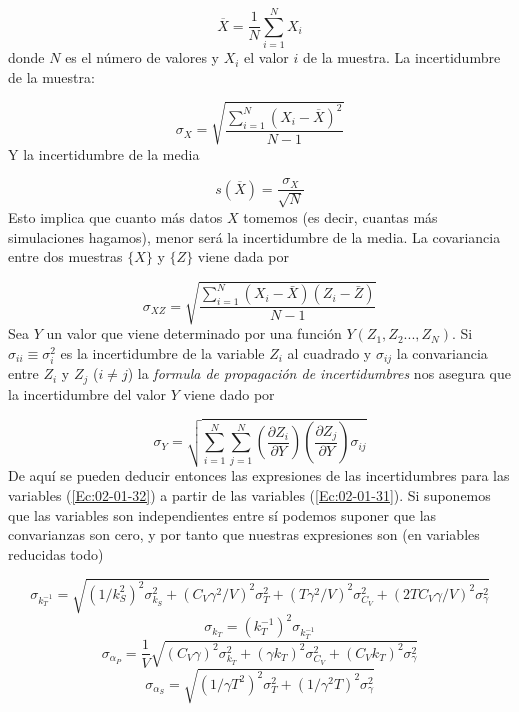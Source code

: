 \documentclass[11pt]{article} %
\newcommand{\parentesis}[1]{\left( #1  \right)}
\newcommand{\parciales}[2]{\frac{\partial #1}{\partial #2}}
\begin{document}
\begin{equation}
	 \overline{X} = \frac{1}{N}\sum_{i=1}^{N} X_i
\end{equation}
donde $N$ es el número de valores y $X_i$ el valor $i$ de la muestra. La incertidumbre de la muestra:

\begin{equation}
	\sigma_X = \sqrt{\frac{\sum_{i=1}^{N} \parentesis{X_i-\overline{X}}^2 }{N-1}}
\end{equation}
Y la incertidumbre de la media

\begin{equation}
	s(\overline{X}) = \frac{\sigma_X}{\sqrt{N}}
\end{equation}
Esto implica que cuanto más datos $X$ tomemos (es decir, cuantas más simulaciones hagamos), menor será la incertidumbre de la media. La covariancia entre dos muestras $\{ X \}$ y $\{ Z \}$ viene dada por 

\begin{equation}
	\sigma_{XZ} = \sqrt{ \frac{\sum_{i=1}^N (X_i-\bar{X})(Z_i-\bar{Z})}{N-1}}
\end{equation} 
Sea $Y$ un valor que viene determinado por una función $Y(Z_1,Z_2...,Z_N)$. Si $\sigma_{ii} \equiv \sigma_{i}^2$ es la incertidumbre de la variable $Z_i$ al cuadrado y $\sigma_{ij}$ la convariancia entre $Z_i$ y $Z_j$ ($i\neq j$) la \textit{formula de propagación de incertidumbres} nos asegura que la incertidumbre del valor $Y$ viene dado por

\begin{equation}
	\sigma_Y = \sqrt{\sum_{i=1}^N \sum_{j=1}^{N} \parentesis{\parciales{Z_i}{Y}}\parentesis{\parciales{Z_j}{Y}} \sigma_{ij} }
\end{equation} 
De aquí se pueden deducir entonces las expresiones de las incertidumbres para las variables (\ref{Ec:02-01-32}) a partir de las variables (\ref{Ec:02-01-31}). Si suponemos que las variables son independientes entre sí podemos suponer que las convarianzas son cero, y por tanto que nuestras expresiones son (en variables reducidas todo)

\begin{equation}
	\sigma_{k_T^{-1}} =\sqrt{(1/k_S^2)^2 \sigma_{k_S}^2+ (C_V\gamma^2/V)^2 \sigma_{T}^2+ (T\gamma^2/V)^2 \sigma_{C_V}^2+ (2TC_V\gamma/V)^2 \sigma_{\gamma}^2}
\end{equation}
\begin{equation}
	\sigma_{k_T} = (k_T^{-1})^2 \sigma_{k_T^{-1}}
\end{equation}
\begin{equation}
	\sigma_{\alpha_P} = \frac{1}{V} \sqrt{(C_V\gamma)^2 \sigma_{k_T}^2+ (\gamma k_T)^2 \sigma_{C_V}^2 + (C_V k_T)^2 \sigma_{\gamma}^2}
\end{equation}
\begin{equation}
	\sigma_{\alpha_S} =\sqrt{(1/\gamma T^2)^2 \sigma_{T}^2+ (1/\gamma^2 T)^2 \sigma_{\gamma}^2}
\end{equation}
\end{document}
